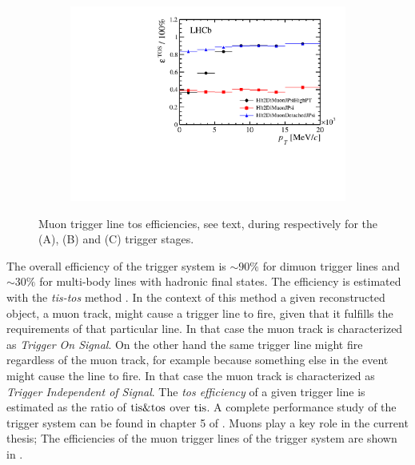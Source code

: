 \begin{figure}[t!]
\begin{subfigure}{0.5\textwidth}
    \includegraphics[width=\textwidth,trim=0.45cm 0cm 0.4cm 0cm, clip=true]{Figures/Chapter2/hlt2_muon_eff}
    \caption{}
    \label{det_run_one_hlt2_muon_line_eff}
  \end{subfigure}
  \caption{Muon trigger line tos efficiencies, see text, during \runone respectively for the \lzero (A), \hltone (B) and \hlttwo (C) trigger stages.}
  \label{det_run_one_muon_line_eff}
\end{figure}

The overall efficiency of the \lhcb trigger system is $\sim 90\%$ for dimuon trigger lines and $\sim 30\%$
for multi-body lines with hadronic final states. The efficiency is estimated with the {\it tis-tos}
method \cite{LHCb-2008-073}. In the context of this method a given reconstructed object,
\ie a muon track, might cause a trigger line to fire, given that it fulfills the requirements of that particular line.
In that case the muon track is characterized as {\it Trigger On Signal}. On the other hand the same trigger line might
fire regardless of the muon track, for example because something else in the event might cause the line
to fire. In that case the muon track is characterized as {\it Trigger Independent of Signal}.
The {\it tos efficiency} of a given trigger line is estimated as the ratio of ${\rm tis}\&{\rm tos}$
over ${\rm tis}$. A complete performance study of the trigger system can be found in chapter 5
of \cite{Aaij:2014jba}. Muons play a key role in the current thesis; The efficiencies of the muon
trigger lines of the \lhcb trigger system are  shown in .

